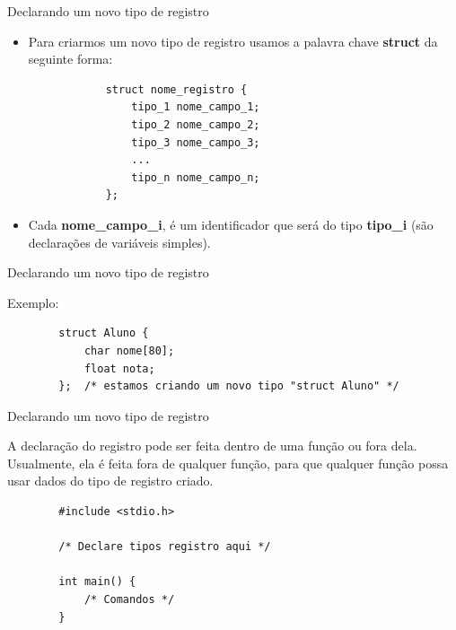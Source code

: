 \documentclass[handout]{beamer}
\begin{document}
\begin{frame}[fragile]{Declarando um novo tipo de registro}

    \begin{itemize}
        \item Para criarmos um novo tipo de registro usamos
        a palavra chave \textbf{struct} da seguinte forma:

        \begin{verbatim}
            struct nome_registro {
                tipo_1 nome_campo_1;
                tipo_2 nome_campo_2;
                tipo_3 nome_campo_3;
                ...
                tipo_n nome_campo_n;
            };
        \end{verbatim}

        \item Cada \textbf{nome\_campo\_i}, é um identificador que
        será do tipo \textbf{tipo\_i} (são declarações de variáveis
        simples).
    \end{itemize}
\end{frame}

\begin{frame}[fragile]{Declarando um novo tipo de registro}

    Exemplo:
    \begin{verbatim}
        struct Aluno {
            char nome[80];
            float nota;
        };  /* estamos criando um novo tipo "struct Aluno" */
    \end{verbatim}

\end{frame}


\begin{frame}[fragile]{Declarando um novo tipo de registro}

    A declaração do registro pode ser feita dentro
    de uma função ou fora dela. Usualmente, ela
    é feita fora de qualquer função, para que qualquer função
    possa usar dados do tipo de registro criado.

    \begin{verbatim}
        #include <stdio.h>

        /* Declare tipos registro aqui */

        int main() {
            /* Comandos */
        }
    \end{verbatim}

\end{frame}
\end{document}
